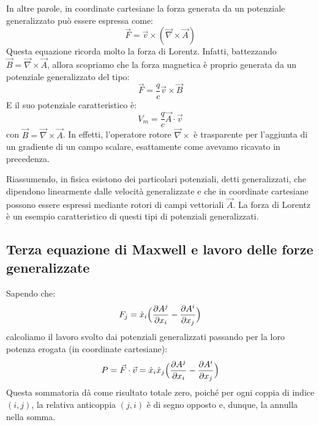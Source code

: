 \documentclass[a4paper,openany]{article}
\begin{document}
	In altre parole, in coordinate cartesiane la forza generata da un potenziale generalizzato può essere espressa come:
	\begin{equation}
		\vec{F} = \vec{v} \times (\vec{\nabla}\times \vec{A})
	\end{equation}
	Questa equazione ricorda molto la forza di Lorentz. Infatti, battezzando $\vec{B} = \vec{\nabla}\times \vec{A}$, allora scopriamo che la forza magnetica è proprio generata da un potenziale generalizzato del tipo:
	\begin{equation}
		\vec{F} = \dfrac{q}{c}\vec{v}\times\vec{B}
	\end{equation}
	E il suo potenziale caratteristico è:
	\begin{equation}
		V_m = \dfrac{q}{c}\vec{A}\cdot\vec{v}
	\end{equation}
	con $\vec{B} = \vec{\nabla}\times\vec{A}$. In effetti, l'operatore rotore $\vec{\nabla}\times$ è trasparente per l'aggiunta di un gradiente di un campo scalare, esattamente come avevamo ricavato in precedenza.
	
	Riassumendo, in fisica esistono dei particolari potenziali, detti generalizzati, che dipendono linearmente dalle velocità generalizzate e che in coordinate cartesiane possono essere espressi mediante rotori di campi vettoriali $\vec{A}$. La forza di Lorentz è un esempio caratteristico di questi tipi di potenziali generalizzati.
	\subsection{Terza equazione di Maxwell e lavoro delle forze generalizzate}
	Sapendo che:
	$$
	F_j = \dot{x}_i \Bigl(\dfrac{\partial A^j}{\partial x_i} -\dfrac{\partial A^i}{\partial x_j}\Bigl)
	$$
	calcoliamo il lavoro svolto dai potenziali generalizzati passando per la loro potenza erogata (in coordinate cartesiane):
	$$
	P = \vec{F}\cdot\vec{v} = \dot{x}_i\dot{x}_j \Bigl(\dfrac{\partial A^j}{\partial x_i} -\dfrac{\partial A^i}{\partial x_j}\Bigl)
	$$
	Questa sommatoria dà come risultato totale zero, poiché per ogni coppia di indice $(i,j)$, la relativa anticoppia $(j,i)$ è di segno opposto e, dunque, la annulla nella somma. 
	
\end{document}
